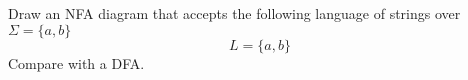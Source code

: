 Draw an NFA diagram that accepts the following
language of strings over $\Sigma =
\{ a, b \}$ 
\[
L = \{a, b\}
\]
Compare with a DFA.
\vspace{2in}
